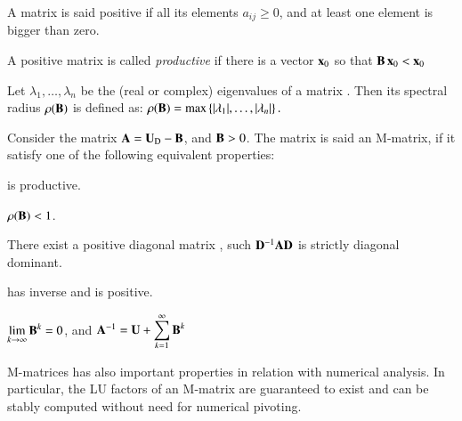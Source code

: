\documentclass{ecos}
\begin{document}
A matrix  is said positive if all its elements $a_{ij}\ge0$, and at least one element is bigger than zero.

A positive matrix  is called \emph{productive} \cite{Gale1986TheModels} if there is a vector $\mathbf{x}_0$ so that
$\mathbf{B}\,\mathbf{x}_0 < \mathbf{x}_0$

Let $\lambda _{1},\dotsc ,\lambda _{n}$ be the (real or complex) eigenvalues of a matrix . Then its spectral radius $\rho(\mathbf{B})$ is defined as:
\(\displaystyle \rho (\mathbf{B})=\max \left\{|\lambda _{1}|,\dotsc ,|\lambda _{n}|\right\}.\)

Consider the matrix $\mathbf{A}=\mathbf{U}_\mathrm{D}-\mathbf{B}$, and $\mathbf{B}>0$. The matrix  is said an M-matrix, if it satisfy one of the following equivalent properties:
\begin{compactenum}[(i)]
	\item {} is productive.
	\item $\rho(\mathbf{B})<1$.
	\item There exist a positive diagonal matrix , such $\mathbf{D}^{-1}\mathbf{A}\mathbf{D}$ is strictly diagonal dominant.
	\item {} has inverse and  is positive.
	\item $\displaystyle{\lim_{k\rightarrow\infty}\ensuremath{\mathbf{B}}^k=0}$, and 
	$\mathbf{A}^{-1}=\mathbf{U}+\displaystyle{\sum_{k=1}^{\infty}{\ensuremath{\mathbf{B}}^{k}}}$	
\end{compactenum}	
M-matrices has also important properties in relation with numerical analysis. In particular, the LU factors of an M-matrix are guaranteed to exist and can be stably computed
without need for numerical pivoting.
\end{document}
